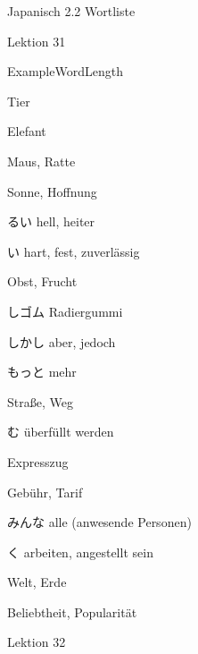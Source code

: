 \noindent
\centering
Japanisch 2.2 Wortliste

Lektion 31

\begin{multicols}{2}
\begin{flushleft}
\begin{labeling}{ExampleWordLength}
	\item [\ruby{動物}{どうぶつ}] Tier
	\item [\ruby{象}{ぞう}] Elefant
	\item [\ruby{鼠}{ねずみ}] Maus, Ratte
	\item [\ruby{太陽}{たいよう}] Sonne, Hoffnung
	\item [\ruby{明}{あか}るい] hell, heiter
	\item [\ruby{硬}{かた}い] hart, fest, zuverlässig
	\item [\ruby{果物}{くだもの}] Obst, Frucht
	\item [\ruby{消}{け}しゴム] Radiergummi
	
	\item [しかし] aber, jedoch
	\item [もっと] mehr
	\item [\ruby{道路}{どうる}] Straße, Weg
	\item [\ruby{込}{こ}む] überfüllt werden
	\item [\ruby{特急電車}{とっきゅうでんしゃ}] Expresszug
	\item [\ruby{料金}{りょうきん}] Gebühr, Tarif
	\item [みんな] alle (anwesende Personen)
	\item [\ruby{働}{はたら}く] arbeiten, angestellt sein
	\item [\ruby{世界}{せかい}] Welt, Erde
	\item [\ruby{人気}{にんき}] Beliebtheit, Popularität
\end{labeling}
\end{flushleft}
\end{multicols}

Lektion 32

